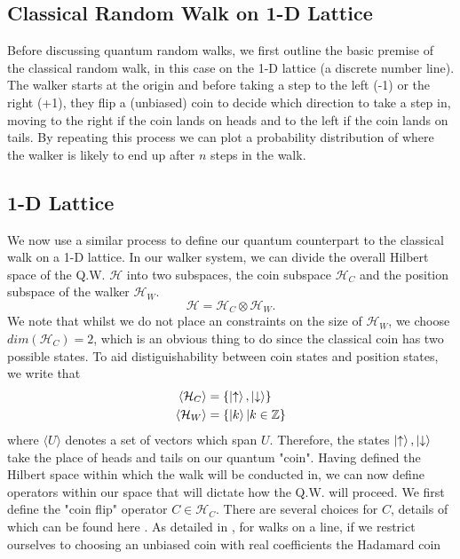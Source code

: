 \subsection{Classical Random Walk on 1-D Lattice}
Before discussing quantum random walks, we first outline the basic premise of the classical random walk, in this case on the 1-D lattice (a discrete number line).
The walker starts at the origin and before taking a step to the left (-1) or the right (+1), they flip a (unbiased) coin to decide which direction to take a step in, moving to the right if the coin lands on heads and to the left if the coin lands on tails. 
By repeating this process we can plot a probability distribution of where the walker is likely to end up after $n$ steps in the walk.
\subsection{1-D Lattice}
We now use a similar process to define our quantum counterpart to the classical walk on a 1-D lattice. 
In our walker system, we can divide the overall Hilbert space of the Q.W. $\mathcal{H}$ into two subspaces, the coin subspace $\mathcal{H}_C$ and the position subspace of the walker $\mathcal{H}_W$. 
\begin{equation}
    \mathcal{H} = \mathcal{H}_C \otimes \mathcal{H}_W.
\end{equation}
We note that whilst we do not place an constraints on the size of $\mathcal{H}_W$, we choose $dim(\mathcal{H}_C) = 2$, which is an obvious thing to do since the classical coin has two possible states. 
To aid distiguishability between coin states and position states, we write that
\begin{align}
    \langle\mathcal{H}_C\rangle &= \{\ket{\uparrow}, \ket{\downarrow}\}\\
    \langle\mathcal{H}_W\rangle &= \{\ket{k} | k\in\mathbb{Z}\}
\end{align}
where $\langle U \rangle$ denotes a set of vectors which span $U$. 
Therefore, the states $\ket{\uparrow}, \ket{\downarrow}$ take the place of heads and tails on our quantum "coin". 
Having defined the Hilbert space within which the walk will be conducted in, we can now define operators within our space that will dictate how the Q.W. will proceed. We first define the "coin flip" operator $C\in \mathcal{H}_C$. 
There are several choices for $C$, details of which can be found here \cite{Tregenna2003}. 
As detailed in \cite{Tregenna2003}, for walks on a line, if we restrict ourselves to choosing an unbiased coin with real coefficients the Hadamard coin
